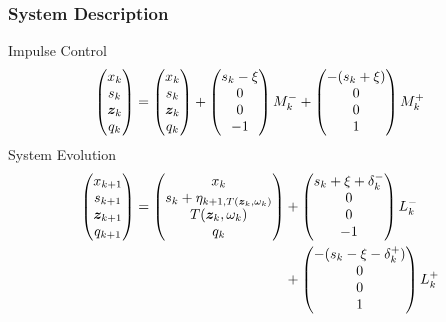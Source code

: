 \begin{frame}
\frametitle{System Description}
Impulse Control
\[ \begin{pmatrix}
x_{k} \\
s_{k} \\
\bm{z}_{k} \\
q_{k} 
\end{pmatrix} = \begin{pmatrix}
x_{k} \\
s_{k} \\
\bm{z}_{k} \\
q_{k}
\end{pmatrix}
+ \begin{pmatrix}
s_k - \xi \\
0 \\
0 \\
-1
\end{pmatrix}M_k^-
+ \begin{pmatrix}
- (s_k + \xi) \\
0 \\
0 \\
1
\end{pmatrix} M_k^+ \]
\vfill
System Evolution
\[ 
\begin{aligned}
\begin{pmatrix}
x_{k+1} \\
s_{k+1} \\
\bm{z}_{k+1} \\
q_{k+1} 
\end{pmatrix} = \begin{pmatrix}
x_k \\
s_{k} + \eta_{k+1,T(\bm{z}_k, \omega_k)} \\
T(\bm{z}_k, \omega_k) \\
q_{k}
\end{pmatrix}
& + \begin{pmatrix}
s_k + \xi + \delta_k^- \\
0 \\
0 \\
-1
\end{pmatrix}L_k^- \\
& + \begin{pmatrix}
- (s_k - \xi - \delta_k^+) \\
0 \\
0 \\
1
\end{pmatrix} L_k^+ 
\end{aligned}
\]
\end{frame}

